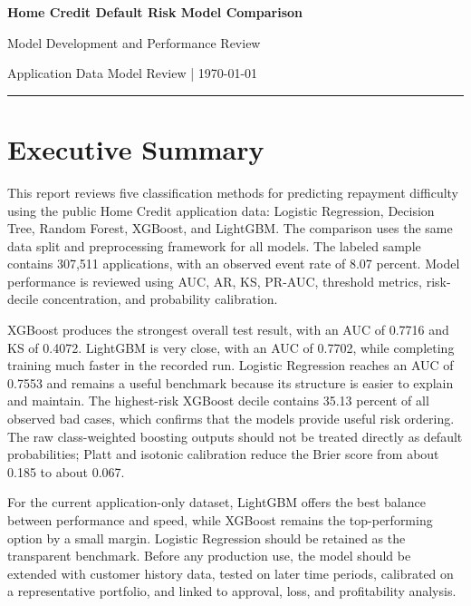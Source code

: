 \documentclass[11pt]{article}
\begin{document}
\begin{center}
{\LARGE\bfseries Home Credit Default Risk Model Comparison}\par
\vspace{0.25em}
{\large Model Development and Performance Review}\par
\vspace{0.45em}
{\small Application Data Model Review \quad | \quad \today}\par
\vspace{0.35em}
\hrule
\end{center}

\section*{Executive Summary}
This report reviews five classification methods for predicting repayment difficulty using the public Home Credit application data: Logistic Regression, Decision Tree, Random Forest, XGBoost, and LightGBM. The comparison uses the same data split and preprocessing framework for all models. The labeled sample contains 307,511 applications, with an observed event rate of 8.07 percent. Model performance is reviewed using AUC, AR, KS, PR-AUC, threshold metrics, risk-decile concentration, and probability calibration.

XGBoost produces the strongest overall test result, with an AUC of 0.7716 and KS of 0.4072. LightGBM is very close, with an AUC of 0.7702, while completing training much faster in the recorded run. Logistic Regression reaches an AUC of 0.7553 and remains a useful benchmark because its structure is easier to explain and maintain. The highest-risk XGBoost decile contains 35.13 percent of all observed bad cases, which confirms that the models provide useful risk ordering. The raw class-weighted boosting outputs should not be treated directly as default probabilities; Platt and isotonic calibration reduce the Brier score from about 0.185 to about 0.067.

For the current application-only dataset, LightGBM offers the best balance between performance and speed, while XGBoost remains the top-performing option by a small margin. Logistic Regression should be retained as the transparent benchmark. Before any production use, the model should be extended with customer history data, tested on later time periods, calibrated on a representative portfolio, and linked to approval, loss, and profitability analysis.

\clearpage
\tableofcontents
\clearpage
\end{document}
